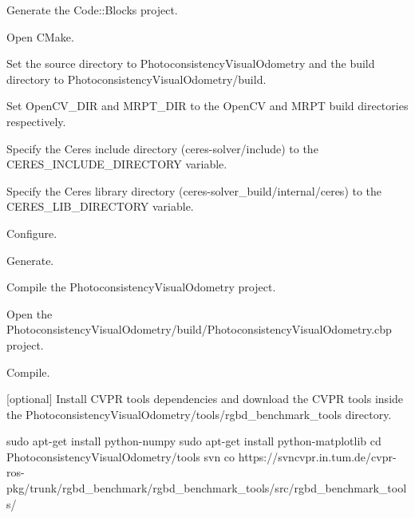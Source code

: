 \begin{DoxyItemize}
\item Generate the Code::Blocks project.
\begin{DoxyEnumerate}
\item Open CMake.
\item Set the source directory to PhotoconsistencyVisualOdometry and the build directory to PhotoconsistencyVisualOdometry/build.
\item Set OpenCV\_\-DIR and MRPT\_\-DIR to the OpenCV and MRPT build directories respectively.
\item Specify the Ceres include directory (ceres-\/solver/include) to the CERES\_\-INCLUDE\_\-DIRECTORY variable.
\item Specify the Ceres library directory (ceres-\/solver\_\-build/internal/ceres) to the CERES\_\-LIB\_\-DIRECTORY variable.
\item Configure.
\item Generate.
\end{DoxyEnumerate}
\end{DoxyItemize}


\begin{DoxyItemize}
\item Compile the PhotoconsistencyVisualOdometry project.
\begin{DoxyEnumerate}
\item Open the PhotoconsistencyVisualOdometry/build/PhotoconsistencyVisualOdometry.cbp project.
\item Compile.
\end{DoxyEnumerate}
\end{DoxyItemize}


\begin{DoxyItemize}
\item \mbox{[}optional\mbox{]} Install CVPR tools dependencies and download the CVPR tools inside the PhotoconsistencyVisualOdometry/tools/rgbd\_\-benchmark\_\-tools directory. \begin{DoxyVerb}
sudo apt-get install python-numpy
sudo apt-get install python-matplotlib 
cd PhotoconsistencyVisualOdometry/tools
svn co https://svncvpr.in.tum.de/cvpr-ros-pkg/trunk/rgbd_benchmark/rgbd_benchmark_tools/src/rgbd_benchmark_tools/
\end{DoxyVerb}

\end{DoxyItemize}



